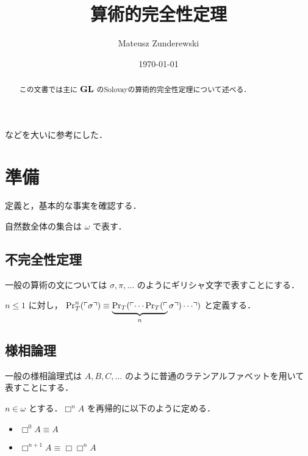 \documentclass{jsarticle}
\title{算術的完全性定理}
\author{Mateusz Zunderewski}
\date{\today}
\begin{document}
\maketitle

\begin{abstract}
	この文書では主に $\mathbf{GL}$ のSolovayの算術的完全性定理について述べる．
\end{abstract}

\setcounter{tocdepth}{3}
\tableofcontents

\pagebreak

\cite{数学基礎論増補版,数学における証明と真理}などを大いに参考にした．

\section{準備}

定義と，基本的な事実を確認する．

\begin{notation}
	自然数全体の集合は $\omega$ で表す．
\end{notation}

\subsection{不完全性定理}

\begin{notation}
	一般の算術の文については $\sigma, \pi, \dots$ のようにギリシャ文字で表すことにする．
\end{notation}

\begin{definition}
	$n \leq 1$ に対し，
	$\mathrm{Pr}_T^n(\ulcorner \sigma \urcorner) \equiv \underbrace{\mathrm{Pr}_T(\ulcorner \cdots \mathrm{Pr}_T(\ulcorner}_{n} \sigma \urcorner) \cdots \urcorner)$ と定義する．
\end{definition}


\subsection{様相論理}

\begin{notation}
	一般の様相論理式は $A,B,C,\dots$ のように普通のラテンアルファベットを用いて表すことにする．
\end{notation}

\begin{definition}
	$n \in \omega$ とする．$\Box^n A$ を再帰的に以下のように定める．
	\begin{itemize}
		\item $\Box^0 A \equiv A$
		\item $\Box^{n+1} A \equiv \Box \Box^n A$
	\end{itemize}
\end{definition}
\end{document}
